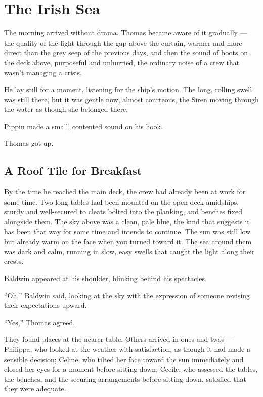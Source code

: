 
\chapter{The Irish Sea}

The morning arrived without drama. Thomas became aware of it gradually --- the quality of the light through the gap above the curtain, warmer and more direct than the grey seep of the previous days, and then the sound of boots on the deck above, purposeful and unhurried, the ordinary noise of a crew that wasn't managing a crisis.

He lay still for a moment, listening for the ship's motion. The long, rolling swell was still there, but it was gentle now, almost courteous, the Siren moving through the water as though she belonged there.

Pippin made a small, contented sound on his hook.

Thomas got up.

\section*{A Roof Tile for Breakfast}

By the time he reached the main deck, the crew had already been at work for some time. Two long tables had been mounted on the open deck amidships, sturdy and well-secured to cleats bolted into the planking, and benches fixed alongside them. The sky above was a clean, pale blue, the kind that suggests it has been that way for some time and intends to continue. The sun was still low but already warm on the face when you turned toward it. The sea around them was dark and calm, running in slow, easy swells that caught the light along their crests.

Baldwin appeared at his shoulder, blinking behind his spectacles.

\enquote{Oh,} Baldwin said, looking at the sky with the expression of someone revising their expectations upward.

\enquote{Yes,} Thomas agreed.

They found places at the nearer table. Others arrived in ones and twos --- Philippa, who looked at the weather with satisfaction, as though it had made a sensible decision; Celine, who tilted her face toward the sun immediately and closed her eyes for a moment before sitting down; Cecile, who assessed the tables, the benches, and the securing arrangements before sitting down, satisfied that they were adequate.

